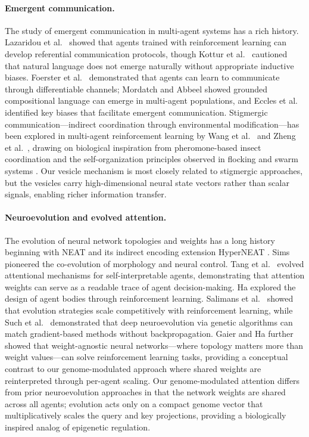 \documentclass[10pt,twocolumn]{article}
\begin{document}
\paragraph{Emergent communication.}
The study of emergent communication in multi-agent systems has a rich history.
Lazaridou et al.\ \cite{lazaridou2017multi} showed that agents trained with reinforcement learning can develop referential communication protocols, though Kottur et al.\ \cite{kottur2017natural} cautioned that natural language does not emerge naturally without appropriate inductive biases.
Foerster et al.\ \cite{foerster2016learning} demonstrated that agents can learn to communicate through differentiable channels; Mordatch and Abbeel \cite{mordatch2018emergence} showed grounded compositional language can emerge in multi-agent populations, and Eccles et al.\ \cite{eccles2019biases} identified key biases that facilitate emergent communication.
Stigmergic communication---indirect coordination through environmental modification---has been explored in multi-agent reinforcement learning by Wang et al.\ \cite{wang2019sigrl} and Zheng et al.\ \cite{zheng2022pool}, drawing on biological inspiration from pheromone-based insect coordination \cite{bonabeau1999swarm} and the self-organization principles observed in flocking \cite{reynolds1987flocks} and swarm systems \cite{camazine2001self}.
Our vesicle mechanism is most closely related to stigmergic approaches, but the vesicles carry high-dimensional neural state vectors rather than scalar signals, enabling richer information transfer.

\paragraph{Neuroevolution and evolved attention.}
The evolution of neural network topologies and weights has a long history beginning with NEAT \cite{stanley2002evolving} and its indirect encoding extension HyperNEAT \cite{stanley2009hypercube}.
Sims \cite{sims1994evolving} pioneered the co-evolution of morphology and neural control.
Tang et al.\ \cite{tang2020neuroevolution} evolved attentional mechanisms for self-interpretable agents, demonstrating that attention weights can serve as a readable trace of agent decision-making.
Ha \cite{ha2019reinforcement} explored the design of agent bodies through reinforcement learning.
Salimans et al.\ \cite{salimans2017evolution} showed that evolution strategies scale competitively with reinforcement learning, while Such et al.\ \cite{such2017deep} demonstrated that deep neuroevolution via genetic algorithms can match gradient-based methods without backpropagation.
Gaier and Ha \cite{gaier2019weight} further showed that weight-agnostic neural networks---where topology matters more than weight values---can solve reinforcement learning tasks, providing a conceptual contrast to our genome-modulated approach where shared weights are reinterpreted through per-agent scaling.
Our genome-modulated attention differs from prior neuroevolution approaches in that the network weights are shared across all agents; evolution acts only on a compact genome vector that multiplicatively scales the query and key projections, providing a biologically inspired analog of epigenetic regulation.
\end{document}
